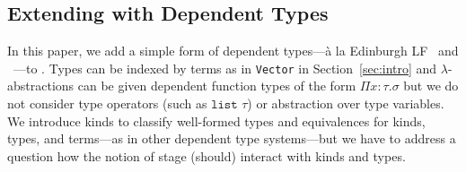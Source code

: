


\subsection{Extending \LTP with Dependent Types}

In this paper, we add a simple form of dependent types---{\`a} la
Edinburgh LF~\cite{harper1993framework} and \LLF~\cite{attapl}---to \LTP.
Types can be indexed by terms as in \texttt{Vector} in
Section~\ref{sec:intro} and \(\lambda\)-abstractions can be given
dependent function types of the form \(\Pi x:\tau. \sigma\) but we do
not consider type operators (such as $\texttt{list } \tau$) or
abstraction over type variables.  We introduce kinds to classify
well-formed types and equivalences for kinds, types, and terms---as
in other dependent type systems---but we have to address a question
how the notion of stage (should) interact with kinds and types.

